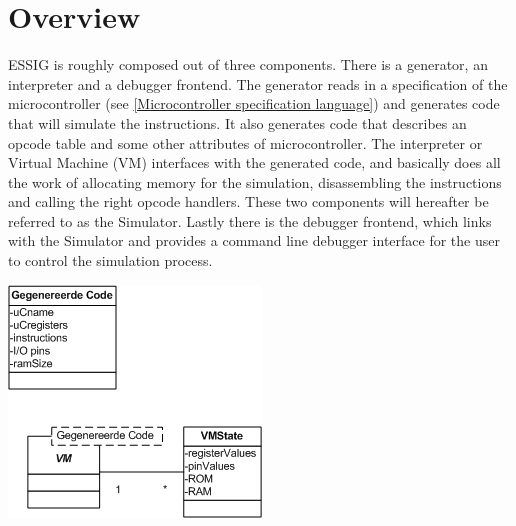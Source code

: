 \chapter{Overview}
\ac{ESSIG} is roughly composed out of three components. There is a generator,
an interpreter and a debugger frontend. The generator reads in a specification
of the microcontroller (see \autoref{Microcontroller specification language})
and generates code that will simulate the instructions. It also generates code
that describes an opcode table and some other attributes of microcontroller.
The interpreter or Virtual Machine (VM) interfaces with the generated code, and
basically does all the work of allocating memory for the simulation,
disassembling the instructions and calling the right opcode handlers. These two
components will hereafter be referred to as the Simulator. Lastly there is the
debugger frontend, which links with the Simulator and provides a command line
debugger interface for the user to control the simulation process.

\begin{center}
\includegraphics{diagrams/Model.png}
\end{center}
